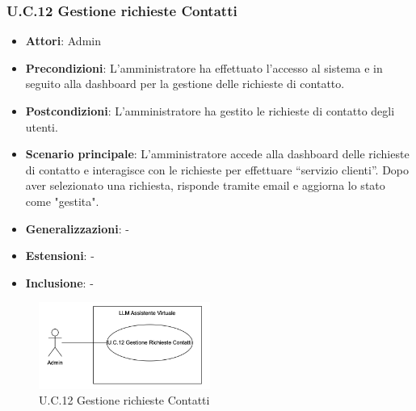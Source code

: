 \subsubsection{U.C.12 Gestione richieste Contatti}
\begin{itemize}
    \item \textbf{Attori}: Admin
    \item \textbf{Precondizioni}: L’amministratore ha effettuato l’accesso al sistema e in seguito alla dashboard per la gestione delle richieste di contatto.
    \item \textbf{Postcondizioni}: L’amministratore ha gestito le richieste di contatto degli utenti.
    \item \textbf{Scenario principale}: L’amministratore accede alla dashboard delle richieste di contatto e interagisce con le richieste per effettuare “servizio clienti”. Dopo aver selezionato una richiesta, risponde tramite email e aggiorna lo stato come "gestita".
    \item \textbf{Generalizzazioni}: -
    \item \textbf{Estensioni}: -
    \item \textbf{Inclusione}: -
\end{itemize}
\begin{figure}[h!]
    \centering
    \includegraphics[width=0.5\textwidth]{img/UC12.png}
    \caption{U.C.12 Gestione richieste Contatti}
\end{figure}
